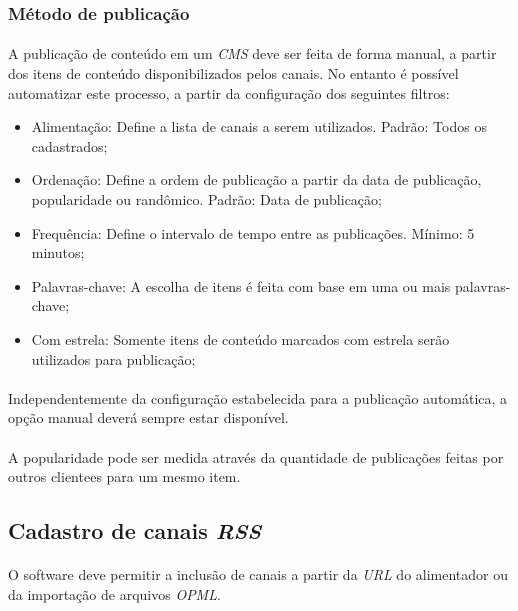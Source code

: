 \documentclass[a4paper,12pt]{article}
\def\cms{\emph{CMS}}
\def\rss{\emph{RSS}}
\begin{document}
\subsubsection{Método de publicação}

\paragraph{}
A publicação de conteúdo em um \cms{} deve ser feita de forma manual, a partir dos itens de conteúdo disponibilizados pelos canais. No entanto é possível automatizar este processo, a partir da configuração dos seguintes filtros:

\begin{itemize}
\item Alimentação: Define a lista de canais a serem utilizados. Padrão: Todos os cadastrados;
\item Ordenação: Define a ordem de publicação a partir da data de publicação, popularidade ou randômico. Padrão: Data de publicação;
\item Frequência: Define o intervalo de tempo entre as publicações. Mínimo: 5 minutos;
\item Palavras-chave: A escolha de itens é feita com base em uma ou mais palavras-chave;
\item Com estrela: Somente itens de conteúdo marcados com estrela serão utilizados para publicação;
\end{itemize}

\paragraph{}
Independentemente da configuração estabelecida para a publicação automática, a opção manual deverá sempre estar disponível.

\paragraph{}
A popularidade pode ser medida através da quantidade de publicações feitas por outros clientees para um mesmo item.

\subsection{Cadastro de canais \rss{}}

\paragraph{}
O software deve permitir a inclusão de canais a partir da \emph{URL} do alimentador ou da importação de arquivos \emph{OPML}.
\end{document}
